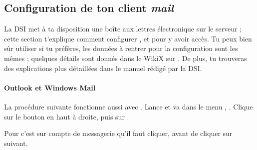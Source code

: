 




\subsection{Configuration de ton client \emph{mail}}

La DSI met \`a  ta disposition une bo\^{i}te aux lettres \'electronique sur
le serveur  ; cette section t'explique comment
configurer ,  et  pour y avoir acc\`es. Tu peux bien
s\^{u}r utiliser  si tu pr\'ef\`eres, les donn\'ees \`a  rentrer
pour la configuration sont les m\^emes ; quelques d\'etails sont donn\'es
dans le WikiX sur \fkz. De plus, tu trouveras des explications plus
d\'etaill\'ees dans le manuel r\'edig\'e par la DSI.

\paragraph{Outlook et Windows Mail}

La proc\'edure suivante fonctionne aussi avec .
Lance  et va dans le menu ,
. Clique sur le bouton  en
haut \`a  droite, puis sur .

Pour  c'est sur compte de messagerie qu'il faut cliquer, avant de cliquer sur suivant.


